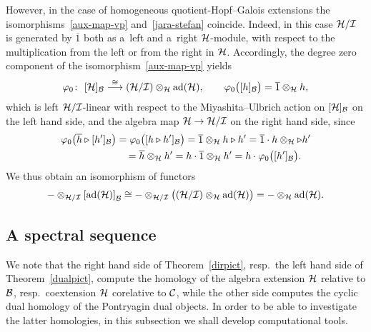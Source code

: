 \documentclass[pdftex]{sigma}
\numberwithin{equation}{section}
\DeclareMathOperator{\ad}{ad}
\newcommand{\wbar}[1]{\overline{#1}}
\begin{document}
However, in the case of homogeneous quotient-Hopf--Galois extensions the isomorphisms~\eqref{aux-map-vp}
and~\eqref{jara-stefan} coincide.
Indeed, in this case ${\cal H}/{\cal I}$ is generated by $\overline{1}$ both as a~left and a~right ${\cal H}$-module,
with respect to the multiplication from the left or from the right in ${\cal H}$.
Accordingly, the degree zero component of the isomorphism~\eqref{aux-map-vp} yields
\begin{gather*}%
\varphi_{0}\colon \   [{\cal H} ]_{{\cal B}} \stackrel{\cong}{\longrightarrow} ({\cal H}/{\cal I})\otimes_{{\cal H}}
\ad({\cal H}),\qquad \varphi_0\big([h]_{\cal B} \big) =\wbar{1} \otimes_{{\cal H}} h,
\end{gather*}
which is left ${\cal H}/{\cal I}$-linear with respect to the Miyashita--Ulbrich action on $[{\cal H}]_{{\cal
B}}$ on the left hand side, and the algebra map ${\cal H}\rightarrow {\cal H}/{\cal I}$ on the right hand side, since
\begin{gather*}%
\varphi_0\big(\wbar{h}\triangleright [h']_{\cal B} \big)
=\varphi_0\big([h\triangleright h']_{\cal B} \big)
=\wbar{1}\otimes_{{\cal H}} h\triangleright h'
=\wbar{1}\cdot h \otimes_{{\cal H}} \triangleright h'
\\
\phantom{\varphi_0\big(\wbar{h}\triangleright [h']_{\cal B} \big)}
=\wbar{h} \otimes_{{\cal H}} h' =h\cdot\wbar{1} \otimes_{{\cal H}} h'=h\cdot\varphi_0\big([h']_{\cal B} \big).
\end{gather*}
We thus obtain an isomorphism of functors
\begin{gather*}%
-\otimes_{{\cal H}/{\cal I}}\left[\ad({\cal H})\right]_{{\cal B}}\cong -\otimes_{{\cal H}/{\cal I}}\big(({\cal
H}/{\cal I})\otimes_{{\cal H}}\ad({\cal H})\big)=-\otimes_{{\cal H}}\ad({\cal H}).
\end{gather*}

\subsection{A spectral sequence}

We note that the right hand side of Theorem~\ref{dirpict}, resp.\
the left hand side of Theorem~\ref{dualpict}, compute the homology of the algebra extension ${\cal H}$ relative to
${\cal B}$, resp.\
coextension ${\cal H}$ corelative to ${\cal C}$, while the other side computes the cyclic dual homology of the
Pontryagin dual objects.
In order to be able to investigate the latter homologies, in this subsection we shall develop computational tools.
\end{document}

